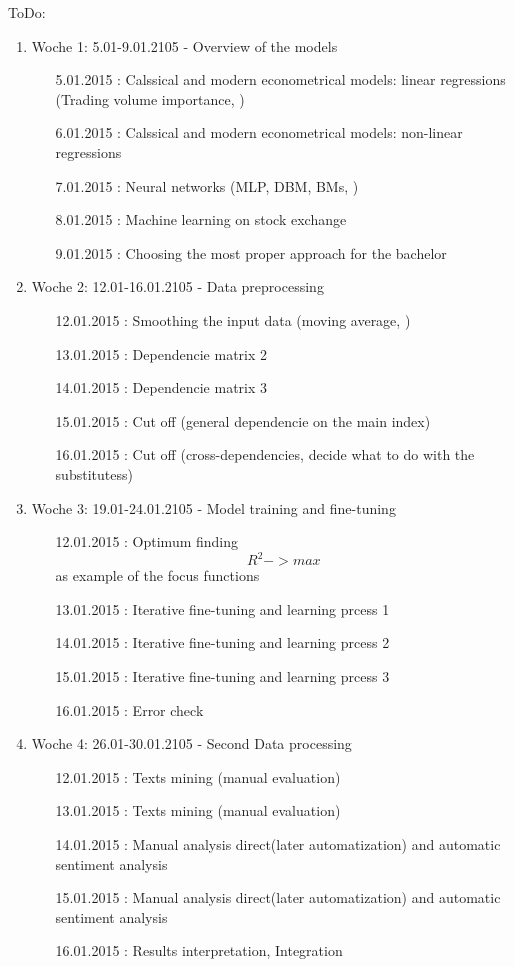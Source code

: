 \documentclass {article}
\begin{document}
ToDo:
\begin{enumerate}
	\item Woche 1: 5.01-9.01.2105 - Overview of the models 
	\begin{enumerate}
		\item[5.01.2015]: Calssical and modern econometrical models:  linear regressions (Trading volume importance, )
		\item[6.01.2015]: Calssical and modern econometrical models:  non-linear regressions
		\item[7.01.2015]: Neural networks (MLP, DBM, BMs, )
		\item[8.01.2015]: Machine learning on stock exchange
		\item[9.01.2015]: Choosing the most proper approach for the bachelor
	\end{enumerate}
	\item Woche 2: 12.01-16.01.2105 - Data preprocessing
	\begin{enumerate}
		\item[12.01.2015]: Smoothing the input data (moving average, )
		\item[13.01.2015]: Dependencie matrix 2
		\item[14.01.2015]: Dependencie matrix 3
		\item[15.01.2015]: Cut off (general dependencie on the main index)
		\item[16.01.2015]: Cut off (cross-dependencies, decide what to do with the substitutess)
	\end{enumerate}
	\item Woche 3: 19.01-24.01.2105 - Model training and fine-tuning
	\begin{enumerate}
		\item[12.01.2015]: Optimum finding  \[ R^2 -> max \] as example of the focus functions
		\item[13.01.2015]: Iterative fine-tuning and learning prcess 1
		\item[14.01.2015]: Iterative fine-tuning and learning prcess 2
		\item[15.01.2015]: Iterative fine-tuning and learning prcess 3
		\item[16.01.2015]: Error check
	\end{enumerate}
	\item Woche 4: 26.01-30.01.2105 - Second Data processing
	\begin{enumerate}
		\item[12.01.2015]: Texts mining (manual evaluation) 
		\item[13.01.2015]: Texts mining (manual evaluation)
		\item[14.01.2015]: Manual analysis direct(later automatization) and automatic sentiment analysis
		\item[15.01.2015]: Manual analysis direct(later automatization) and automatic sentiment analysis
		\item[16.01.2015]: Results interpretation, Integration 
	\end{enumerate}
\end{enumerate}
\end{document}
